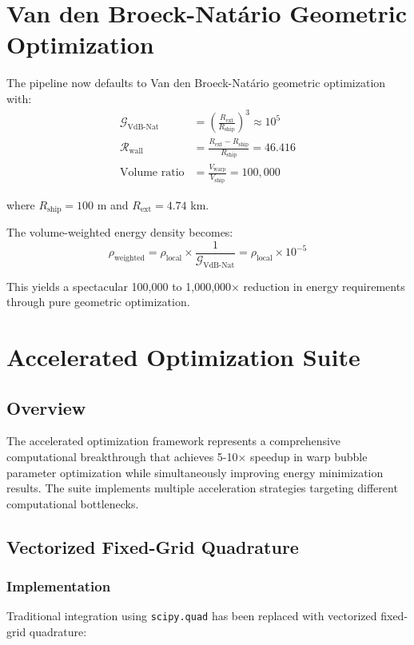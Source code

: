 \documentclass[11pt,a4paper]{article}
\begin{document}
\section{Van den Broeck-Natário Geometric Optimization}
\label{sec:vdb_natario}

The pipeline now defaults to Van den Broeck-Natário geometric optimization with:
\begin{align}
\mathcal{G}_{\text{VdB-Nat}} &= \left(\frac{R_{\text{ext}}}{R_{\text{ship}}}\right)^3 \approx 10^5 \\
\mathcal{R}_{\text{wall}} &= \frac{R_{\text{ext}} - R_{\text{ship}}}{R_{\text{ship}}} = 46.416 \\
\text{Volume ratio} &= \frac{V_{\text{warp}}}{V_{\text{ship}}} = 100,000
\end{align}

where $R_{\text{ship}} = 100$ m and $R_{\text{ext}} = 4.74$ km.

The volume-weighted energy density becomes:
\begin{equation}
\rho_{\text{weighted}} = \rho_{\text{local}} \times \frac{1}{\mathcal{G}_{\text{VdB-Nat}}} = \rho_{\text{local}} \times 10^{-5}
\end{equation}

This yields a spectacular 100,000 to 1,000,000× reduction in energy requirements through pure geometric optimization.

\section{Accelerated Optimization Suite}
\label{sec:accelerated_optimization}

\subsection{Overview}

The accelerated optimization framework represents a comprehensive computational breakthrough that achieves 5-10× speedup in warp bubble parameter optimization while simultaneously improving energy minimization results. The suite implements multiple acceleration strategies targeting different computational bottlenecks.

\subsection{Vectorized Fixed-Grid Quadrature}

\subsubsection{Implementation}
Traditional integration using \texttt{scipy.quad} has been replaced with vectorized fixed-grid quadrature:
\end{document}
